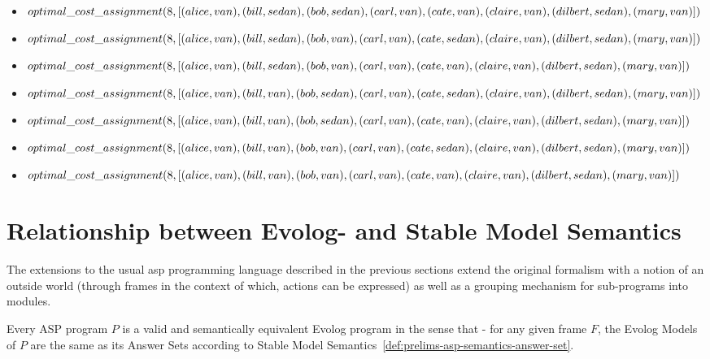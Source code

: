\begin{itemize}
	\item $optimal\_cost\_assignment(8, [(alice, van), (bill, sedan), (bob, sedan), (carl, van),\\(cate, van), (claire, van), (dilbert, sedan), (mary, van)])$
	\item $optimal\_cost\_assignment(8, [(alice, van), (bill, sedan), (bob, van), (carl, van),\\(cate, sedan), (claire, van), (dilbert, sedan), (mary, van)])$
	\item $optimal\_cost\_assignment(8, [(alice, van), (bill, sedan), (bob, van), (carl, van),\\(cate, van), (claire, van), (dilbert, sedan), (mary, van)])$
	\item $optimal\_cost\_assignment(8, [(alice, van), (bill, van), (bob, sedan), (carl, van),\\(cate, sedan), (claire, van), (dilbert, sedan), (mary, van)])$
	\item $optimal\_cost\_assignment(8, [(alice, van), (bill, van), (bob, sedan), (carl, van),\\(cate, van), (claire, van), (dilbert, sedan), (mary, van)])$
	\item $optimal\_cost\_assignment(8, [(alice, van), (bill, van), (bob, van), (carl, van),\\(cate, sedan), (claire, van), (dilbert, sedan), (mary, van)])$
	\item $optimal\_cost\_assignment(8, [(alice, van), (bill, van), (bob, van), (carl, van),\\(cate, van), (claire, van), (dilbert, sedan), (mary, van)])$
\end{itemize}



\section{Relationship between Evolog- and Stable Model Semantics}

The extensions to the usual \gls{asp} programming language described in the previous sections extend the original formalism with a notion of an outside world (through frames in the context of which, actions can be expressed) as well as a grouping mechanism for sub-programs into modules.

\begin{theorem}[Extension]
\label{thm:extension}
Every ASP program $P$ is a valid and semantically equivalent Evolog program in the sense that - for any given frame $F$, the Evolog Models of $P$ are the same as its Answer Sets according to Stable Model Semantics~\ref{def:prelims-asp-semantics-answer-set}.
\end{theorem}

